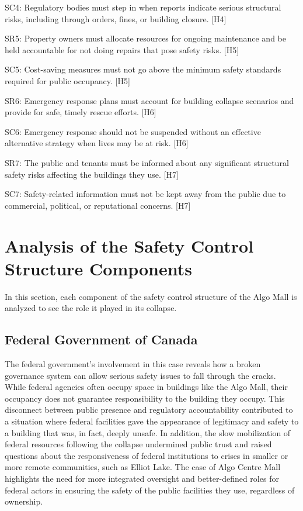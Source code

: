 \documentclass[12pt]{article}
\begin{document}
SC4: Regulatory bodies must step in when reports indicate serious structural risks, including through orders, fines, or building closure. [H4]

SR5: Property owners must allocate resources for ongoing maintenance and be held accountable for not doing repairs that pose safety risks. [H5]

SC5: Cost-saving measures must not go above the minimum safety standards required for public occupancy. [H5]

SR6: Emergency response plans must account for building collapse scenarios and provide for safe, timely rescue efforts. [H6]

SC6: Emergency response should not be suspended without an effective alternative strategy when lives may be at risk. [H6]

SR7: The public and tenants must be informed about any significant structural safety risks affecting the buildings they use. [H7]

SC7: Safety-related information must not be kept away from the public due to commercial, political, or reputational concerns. [H7]

\section{Analysis of the Safety Control Structure Components}

In this section, each component of the safety control structure of the Algo Mall is analyzed to see the role it played in its collapse.

\subsection{Federal Government of Canada}

The federal government's involvement in this case reveals how a broken governance system can allow serious safety issues to fall through the cracks. While federal agencies often occupy space in buildings like the Algo Mall, their occupancy does not guarantee responsibility to the building they occupy. This disconnect between public presence and regulatory accountability contributed to a situation where federal facilities gave the appearance of legitimacy and safety to a building that was, in fact, deeply unsafe. In addition, the slow mobilization of federal resources following the collapse undermined public trust and raised questions about the responsiveness of federal institutions to crises in smaller or more remote communities, such as Elliot Lake. The case of Algo Centre Mall highlights the need for more integrated oversight and better-defined roles for federal actors in ensuring the safety of the public facilities they use, regardless of ownership.
\end{document}
